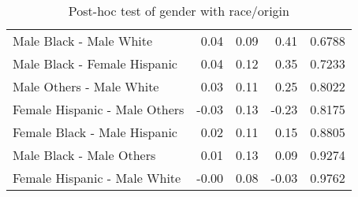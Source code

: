 \begin{table}[H]
\begin{tabular}{lrrrr}
    Male Black -  Male White & 0.04 & 0.09 & 0.41 & 0.6788 \\ 
    Male Black -  Female Hispanic & 0.04 & 0.12 & 0.35 & 0.7233 \\ 
    Male Others -  Male White & 0.03 & 0.11 & 0.25 & 0.8022 \\ 
    Female Hispanic -  Male Others & -0.03 & 0.13 & -0.23 & 0.8175 \\ 
    Female Black -  Male Hispanic & 0.02 & 0.11 & 0.15 & 0.8805 \\ 
    Male Black -  Male Others & 0.01 & 0.13 & 0.09 & 0.9274 \\ 
    Female Hispanic -  Male White & -0.00 & 0.08 & -0.03 & 0.9762 \\ 
   \hline
\end{tabular}
\caption{Post-hoc test of gender with race/origin} 
\label{tab:DisabGenderRaceOrigin}
\end{table}


